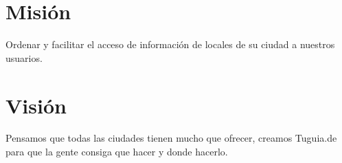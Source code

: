 \section{Misión} \label{sect:Mision}
Ordenar y facilitar el acceso de información de locales de su ciudad a nuestros usuarios.

\section{Visión} \label{sect:Vision}
Pensamos que todas las ciudades tienen mucho que ofrecer, creamos Tuguia.de para que la gente consiga que hacer y donde hacerlo.